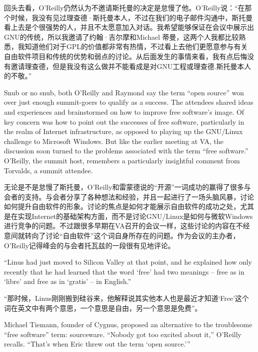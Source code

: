 \ifdefined\chs
回头去看，O'Reilly仍然认为不邀请斯托曼的决定是怠慢了他。O’Reilly说：“在那个时候，我没有见过理查德·斯托曼本人，不过在我们的电子邮件沟通中，斯托曼看上去是个很强势的人，并且不太愿意加入对话。我希望能够保证在会议中展示出GNU的传统，所以我邀请了约翰·吉尔摩和Michael 蒂曼，这两个人我都比较熟悉，我知道他们对于GPL的价值都非常有热情，不过看上去他们更愿意参与有关自由软件项目和传统的优势和弱点的讨论。从后面发生的事情来看，我有点后悔没有邀请理查德，但是我没有这么做并不能看成是对GNU工程或理查德.斯托曼本人的不敬。”
\fi

\ifdefined\eng
Snub or no snub, both O'Reilly and Raymond say the term ``open source'' won over just enough summit-goers to qualify as a success. The attendees shared ideas and experiences and brainstormed on how to improve free software's image. Of key concern was how to point out the successes of free software, particularly in the realm of Internet infrastructure, as opposed to playing up the GNU/Linux challenge to Microsoft Windows. But like the earlier meeting at VA, the discussion soon turned to the problems associated with the term ``free software.'' O'Reilly, the summit host, remembers a particularly insightful comment from Torvalds, a summit attendee.
\fi

\ifdefined\chs
无论是不是怠慢了斯托曼，O'Reilly和雷蒙德说的“开源”一词成功的赢得了很多与会者的支持。与会者分享了各种想法和经验，并且一起进行了一场头脑风暴，讨论如何提升自由软件的形象。讨论的焦点是如何才能展示自由软件的成功之处，尤其是在实现Internet的基础架构方面，而不是讨论GNU/Linux是如何与微软Windows进行竞争的问题。不过跟很多早期在VA召开的会议一样，这些讨论的内容在不经意间就转向了讨论“自由软件”这个词自身所存在的问题。作为会议的主办者，O'Reilly记得峰会的与会者托瓦兹的一段很有见地评论。
\fi

\ifdefined\eng
``Linus had just moved to Silicon Valley at that point, and he explained how only recently that he had learned that the word `free' had two meanings -- free as in `libre' and free as in `gratis' -- in English.''
\fi

\ifdefined\chs
“那时候，Linus刚刚搬到硅谷来，他解释说其实他本人也是最近才知道‘Free’这个词在英文中有两个意思，一个意思是自由，另一个意思是免费”。
\fi

\ifdefined\eng
Michael Tiemann, founder of Cygnus, proposed an alternative to the troublesome ``free software'' term: sourceware. ``Nobody got too excited about it,'' O'Reilly recalls. ``That's when Eric threw out the term `open source.'\hspace{0.01in}''
\fi

